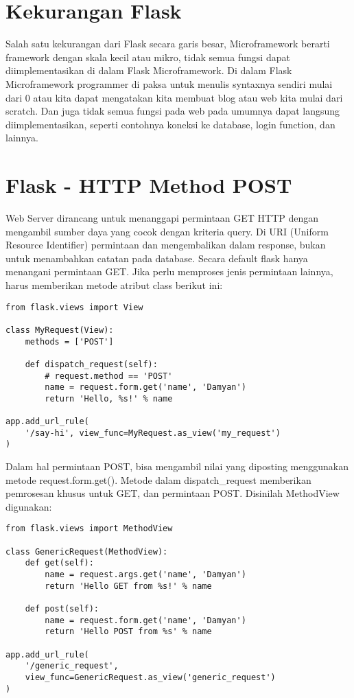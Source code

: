 \section{Kekurangan Flask}
Salah satu kekurangan dari Flask secara garis besar, Microframework berarti framework dengan skala kecil atau mikro, tidak semua fungsi dapat diimplementasikan di dalam Flask Microframework.  Di dalam Flask Microframework programmer di paksa untuk menulis syntaxnya sendiri mulai dari 0 atau kita dapat mengatakan kita membuat blog atau web kita mulai dari scratch. Dan juga tidak semua fungsi pada web pada umumnya dapat langsung diimplementasikan, seperti contohnya koneksi ke database, login function, dan lainnya\cite{ronacher2010flask}.

\section{Flask - HTTP Method POST}
Web Server dirancang untuk menanggapi permintaan GET HTTP dengan mengambil sumber daya yang cocok dengan kriteria query. Di URI (Uniform Resource Identifier) permintaan dan mengembalikan dalam response, bukan untuk menambahkan catatan pada database\cite{rodriguez2008restful}. Secara default flask hanya menangani permintaan GET. Jika perlu memproses jenis permintaan lainnya, harus memberikan metode atribut class berikut ini:

\begin{verbatim}
from flask.views import View

class MyRequest(View):
    methods = ['POST']

    def dispatch_request(self):
        # request.method == 'POST'
        name = request.form.get('name', 'Damyan')
        return 'Hello, %s!' % name

app.add_url_rule(
    '/say-hi', view_func=MyRequest.as_view('my_request')
)
\end{verbatim}

Dalam hal permintaan POST, bisa mengambil nilai yang diposting menggunakan metode request.form.get(). Metode dalam dispatch_request memberikan pemrosesan khusus untuk GET, dan permintaan POST. Disinilah MethodView digunakan:

\begin{verbatim}
from flask.views import MethodView

class GenericRequest(MethodView):
    def get(self):
        name = request.args.get('name', 'Damyan')
        return 'Hello GET from %s!' % name

    def post(self):
        name = request.form.get('name', 'Damyan')
        return 'Hello POST from %s' % name

app.add_url_rule(
    '/generic_request',
    view_func=GenericRequest.as_view('generic_request')
)
\end{verbatim}


